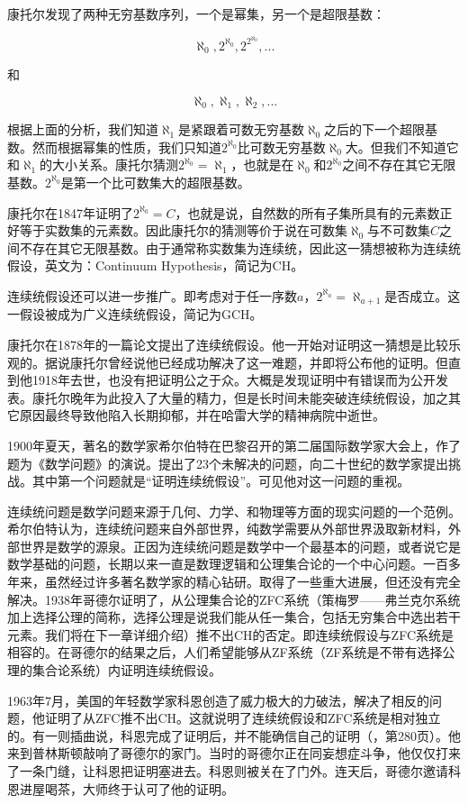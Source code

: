 \documentclass{article}
\begin{document}
康托尔发现了两种无穷基数序列，一个是幂集，另一个是超限基数：

\[
\aleph_0, 2^{\aleph_0}, 2^{2^{\aleph_0}}, ...
\]

和

\[
\aleph_0, \aleph_1, \aleph_2, ...
\]

根据上面的分析，我们知道$\aleph_1$是紧跟着可数无穷基数$\aleph_0$之后的下一个超限基数。然而根据幂集的性质，我们只知道$2^{\aleph_0}$比可数无穷基数$\aleph_0$大。但我们不知道它和$\aleph_1$的大小关系。康托尔猜测$2^{\aleph_0} = \aleph_1$，也就是在$\aleph_0$和$2^{\aleph_0}$之间不存在其它无限基数。$2^{\aleph_0}$是第一个比可数集大的超限基数。

康托尔在1847年证明了$2^{\aleph_0} = C$，也就是说，自然数的所有子集所具有的元素数正好等于实数集的元素数。因此康托尔的猜测等价于说在可数集$\aleph_0$与不可数集$C$之间不存在其它无限基数。由于通常称实数集为连续统，因此这一猜想被称为连续统假设，英文为：Continuum Hypothesis，简记为CH。

连续统假设还可以进一步推广。即考虑对于任一序数$a$，$2^{\aleph_a} = \aleph_{a+1}$是否成立。这一假设被成为广义连续统假设，简记为GCH。

康托尔在1878年的一篇论文提出了连续统假设。他一开始对证明这一猜想是比较乐观的。据说康托尔曾经说他已经成功解决了这一难题，并即将公布他的证明。但直到他1918年去世，也没有把证明公之于众。大概是发现证明中有错误而为公开发表。康托尔晚年为此投入了大量的精力，但是长时间未能突破连续统假设，加之其它原因最终导致他陷入长期抑郁，并在哈雷大学的精神病院中逝世。

1900年夏天，著名的数学家希尔伯特在巴黎召开的第二届国际数学家大会上，作了题为《数学问题》的演说。提出了23个未解决的问题，向二十世纪的数学家提出挑战。其中第一个问题就是“证明连续统假设”。可见他对这一问题的重视。

连续统问题是数学问题来源于几何、力学、和物理等方面的现实问题的一个范例。希尔伯特认为，连续统问题来自外部世界，纯数学需要从外部世界汲取新材料，外部世界是数学的源泉。正因为连续统问题是数学中一个最基本的问题，或者说它是数学基础的问题，长期以来一直是数理逻辑和公理集合论的一个中心问题。一百多年来，虽然经过许多著名数学家的精心钻研。取得了一些重大进展，但还没有完全解决。1938年哥德尔证明了，从公理集合论的ZFC系统（策梅罗——弗兰克尔系统加上选择公理的简称，选择公理是说我们能从任一集合，包括无穷集合中选出若干元素。我们将在下一章详细介绍）推不出CH的否定。即连续统假设与ZFC系统是相容的。在哥德尔的结果之后，人们希望能够从ZF系统（ZF系统是不带有选择公理的集合论系统）内证明连续统假设。

1963年7月，美国的年轻数学家科恩创造了威力极大的力破法，解决了相反的问题，他证明了从ZFC推不出CH。这就说明了连续统假设和ZFC系统是相对独立的。有一则插曲说，科恩完成了证明后，并不能确信自己的证明（\cite{HanXueTao16}，第280页）。他来到普林斯顿敲响了哥德尔的家门。当时的哥德尔正在同妄想症斗争，他仅仅打来了一条门缝，让科恩把证明塞进去。科恩则被关在了门外。连天后，哥德尔邀请科恩进屋喝茶，大师终于认可了他的证明。
\end{document}
